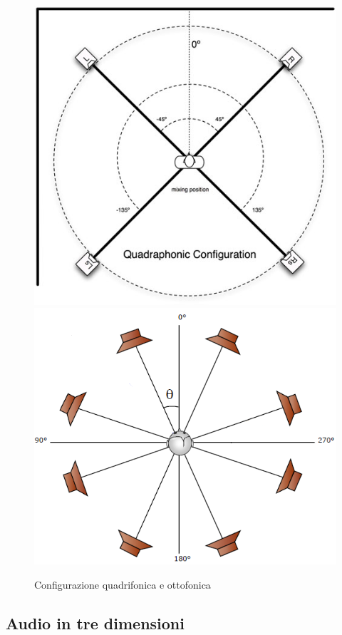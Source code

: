 \documentclass[12pt,a4paper]{report}
\begin{document}
\begin{figure}[htbp]
	\centering
	\includegraphics[scale=0.35]{figures/quad.jpg}\includegraphics[scale=0.55]{figures/ottofonia.png}
	\caption {Configurazione quadrifonica e ottofonica} 
	\label{fig:quadrifonia}
	\end{figure}

\subsection{Audio in tre dimensioni}
\end{document}
